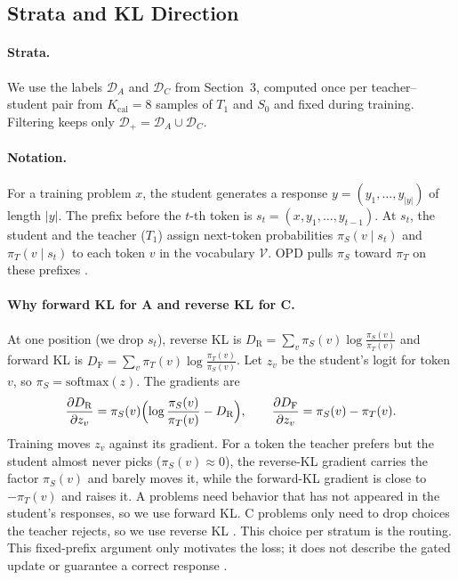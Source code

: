 \documentclass[10pt]{article}
\begin{document}
\subsection{Strata and KL Direction}
\label{sec:strata-kl}

\paragraph{Strata.} We use the labels $\mathcal D_A$ and $\mathcal D_C$ from
Section~3, computed once per teacher--student pair from $K_{\mathrm{cal}}=8$
samples of $T_1$ and $S_0$ and fixed during training. Filtering keeps only
$\mathcal D_+=\mathcal D_A\cup\mathcal D_C$.

\paragraph{Notation.} For a training problem $x$, the student generates a
response $y=(y_1,\ldots,y_{|y|})$ of length $|y|$. The prefix before the $t$-th
token is $s_t=(x,y_1,\ldots,y_{t-1})$. At $s_t$, the student and the teacher
($T_1$) assign next-token probabilities $\pi_S(v\mid s_t)$ and
$\pi_T(v\mid s_t)$ to each token $v$ in the vocabulary $\mathcal V$. OPD pulls
$\pi_S$ toward $\pi_T$ on these prefixes \citep{agarwal2024opd,gu2024minillm}.

\paragraph{Why forward KL for A and reverse KL for C.} At one position (we drop
$s_t$), reverse KL is $D_{\mathrm R}=\sum_v\pi_S(v)\log\frac{\pi_S(v)}{\pi_T(v)}$
and forward KL is $D_{\mathrm F}=\sum_v\pi_T(v)\log\frac{\pi_T(v)}{\pi_S(v)}$.
Let $z_v$ be the student's logit for token $v$, so $\pi_S=\mathrm{softmax}(z)$.
The gradients are
\begin{equation}
\frac{\partial D_{\mathrm R}}{\partial z_v}=\pi_S(v)\Bigl(\log\frac{\pi_S(v)}{\pi_T(v)}-D_{\mathrm R}\Bigr),
\qquad
\frac{\partial D_{\mathrm F}}{\partial z_v}=\pi_S(v)-\pi_T(v).
\label{eq:kl}
\end{equation}
Training moves $z_v$ against its gradient. For a token the teacher prefers but
the student almost never picks ($\pi_S(v)\approx0$), the reverse-KL gradient
carries the factor $\pi_S(v)$ and barely moves it, while the forward-KL
gradient is close to $-\pi_T(v)$ and raises it. A problems need behavior that
has not appeared in the student's responses, so we use forward KL. C problems
only need to drop choices the teacher rejects, so we use reverse KL
\citep{jung2025todi}. This choice per stratum is the routing. This fixed-prefix argument only motivates the loss; it
does not describe the gated update or guarantee a correct response
\citep{sheng2026ier}.
\end{document}
